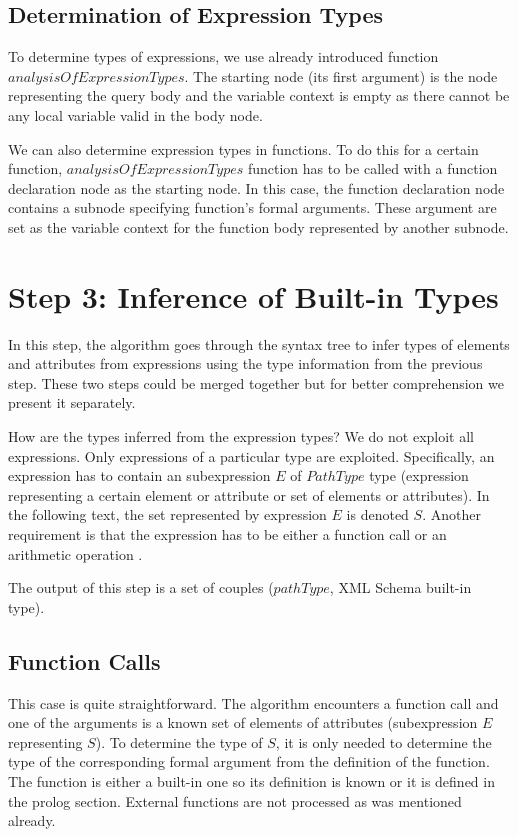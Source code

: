 \subsection{Determination of Expression Types}
To determine types of expressions, we use already introduced function \linebreak $analysisOfExpressionTypes$. The starting node (its first argument) is the node representing the query body and the variable context is empty as there cannot be any local variable valid in the body node.

We can also determine expression types in functions. To do this for a certain function, $analysisOfExpressionTypes$ function has to be called with a function declaration node as the starting node. In this case, the function declaration node contains a subnode specifying function's formal arguments. These argument are set as the variable context for the function body represented by another subnode.

\section{Step 3: Inference of Built-in Types}
In this step, the algorithm goes through the syntax tree to infer types of elements and attributes from expressions using the type information from the previous step. These two steps could be merged together but for better comprehension we present it separately.

How are the types inferred from the expression types? We do not exploit all expressions. Only expressions of a particular type are exploited. Specifically, an expression has to contain an subexpression $E$ of $PathType$ type (expression representing a certain element or attribute or set of elements or attributes). In the following text, the set represented by expression $E$ is denoted $S$. Another requirement is that the expression has to be either a function call or an arithmetic operation .

The output of this step is a set of couples ($pathType$, XML Schema built-in type).


\subsection{Function Calls}
This case is quite straightforward. The algorithm encounters a function call and one of the arguments is a known set of elements of attributes (subexpression $E$ representing $S$). To determine the type of $S$, it is only needed to determine the type of the corresponding formal argument from the definition of the function. The function is either a built-in one so its definition is known or it is defined in the prolog section. External functions are not processed as was mentioned already.

